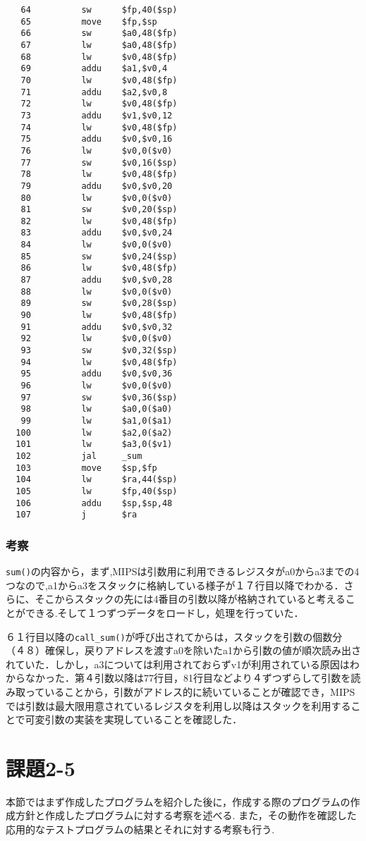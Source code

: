 \documentclass[a4j,11pt]{jarticle}
\begin{document}
\begin{verbatim}
   64          sw      $fp,40($sp)
   65          move    $fp,$sp
   66          sw      $a0,48($fp)
   67          lw      $a0,48($fp)
   68          lw      $v0,48($fp)
   69          addu    $a1,$v0,4
   70          lw      $v0,48($fp)
   71          addu    $a2,$v0,8
   72          lw      $v0,48($fp)
   73          addu    $v1,$v0,12
   74          lw      $v0,48($fp)
   75          addu    $v0,$v0,16
   76          lw      $v0,0($v0)
   77          sw      $v0,16($sp)
   78          lw      $v0,48($fp)
   79          addu    $v0,$v0,20
   80          lw      $v0,0($v0)
   81          sw      $v0,20($sp)
   82          lw      $v0,48($fp)
   83          addu    $v0,$v0,24
   84          lw      $v0,0($v0)
   85          sw      $v0,24($sp)
   86          lw      $v0,48($fp)
   87          addu    $v0,$v0,28
   88          lw      $v0,0($v0)
   89          sw      $v0,28($sp)
   90          lw      $v0,48($fp)
   91          addu    $v0,$v0,32
   92          lw      $v0,0($v0)
   93          sw      $v0,32($sp)
   94          lw      $v0,48($fp)
   95          addu    $v0,$v0,36
   96          lw      $v0,0($v0)
   97          sw      $v0,36($sp)
   98          lw      $a0,0($a0)
   99          lw      $a1,0($a1)
  100          lw      $a2,0($a2)
  101          lw      $a3,0($v1)
  102          jal     _sum
  103          move    $sp,$fp
  104          lw      $ra,44($sp)
  105          lw      $fp,40($sp)
  106          addu    $sp,$sp,48
  107          j       $ra
  \end{verbatim}
  \subsubsection{考察}
  \verb|sum()|の内容から，まず,MIPSは引数用に利用できるレジスタがa0からa3までの4つなので,a1からa3をスタックに格納している様子が１７行目以降でわかる．さらに、そこからスタックの先には4番目の引数以降が格納されていると考えることができる.そして１つずつデータをロードし，処理を行っていた．
  
  ６１行目以降の\verb|call_sum()|が呼び出されてからは，スタックを引数の個数分（４８）確保し，戻りアドレスを渡すa0を除いたa1から引数の値が順次読み出されていた．しかし，a3については利用されておらずv1が利用されている原因はわからなかった．第４引数以降は77行目，81行目などより４ずつずらして引数を読み取っていることから，引数がアドレス的に続いていることが確認でき，MIPSでは引数は最大限用意されているレジスタを利用し以降はスタックを利用することで可変引数の実装を実現していることを確認した．

 \section{課題2-5}
本節ではまず作成したプログラムを紹介した後に，作成する際のプログラムの作成方針と作成したプログラムに対する考察を述べる.
また，その動作を確認した応用的なテストプログラムの結果とそれに対する考察も行う.
\end{document}
